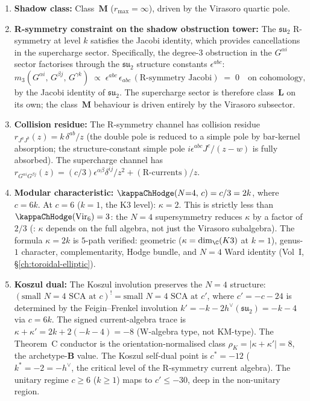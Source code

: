 \begin{proposition}[Small $N{=}4$ SCA shadow data;
 \ClaimStatusProvedHere]
\label{prop:N4-shadow}
\begin{enumerate}[label=\textup{(\roman*)},nosep]
\item \textbf{Shadow class:} Class~$\mathbf{M}$
 \textup{(}$r_{\max} = \infty$\textup{)}, driven by the Virasoro
 quartic pole.

\item \textbf{R-symmetry constraint on the shadow obstruction tower:}
 The $\mathfrak{su}_2$ R-symmetry at level $k$ satisfies
 the Jacobi identity, which provides cancellations in the
 supercharge sector. Specifically, the degree-$3$ obstruction
 in the $G^{\alpha i}$ sector factorises through the $\mathfrak{su}_2$
 structure constants $\epsilon^{abc}$:
 \[
 m_3(G^{\alpha i},\, G^{\beta j},\, G^{\gamma k})
 \;\propto\;
 \epsilon^{abc}\, \epsilon_{abc}\,
 (\text{R-symmetry Jacobi})
 \;=\; 0
 \quad\text{on cohomology,}
 \]
 by the Jacobi identity of $\mathfrak{su}_2$.
 The supercharge sector is therefore class~$\mathbf{L}$ on its own;
 the class~$\mathbf{M}$ behaviour is driven entirely by the
 Virasoro subsector.

\item \textbf{Collision residue:}
 The R-symmetry channel has collision residue
 $r_{J^aJ^b}(z) = k\,\delta^{ab}/z$
 \textup{(}the double pole is reduced to a simple pole by
 bar-kernel absorption; the structure-constant simple pole
 $i\epsilon^{abc}J^c/(z-w)$ is fully absorbed\textup{)}.
 The supercharge channel has
 $r_{G^{\alpha i}G^{\beta j}}(z)
 = (c/3)\epsilon^{\alpha\beta}\delta^{ij}/z^2 + (\text{R-currents})/z$.

\item \textbf{Modular characteristic:}
 $\kappaChHodge(N{=}4,\, c) = c/3 = 2k$, where $c = 6k$.
 At $c = 6$ \textup{(}$k = 1$, the K3 level\textup{)}:
 $\kappa = 2$. This is strictly less than
 $\kappaChHodge(\mathrm{Vir}_6) = 3$: the $N{=}4$ supersymmetry
 reduces $\kappa$ by a factor of $2/3$
 \textup{(}: $\kappa$ depends on the full algebra,
 not just the Virasoro subalgebra\textup{)}.
 The formula $\kappa = 2k$ is $5$-path verified:
 geometric \textup{(}$\kappa = \dim_{\C}(K3)$ at $k = 1$\textup{)},
 genus-$1$ character, complementarity, Hodge bundle, and
 $N{=}4$ Ward identity
 \textup{(}Vol~I, \S\ref{ch:toroidal-elliptic}\textup{)}.

\item \textbf{Koszul dual:}
 The Koszul involution preserves the $N{=}4$ structure:
 $(\text{small $N{=}4$ SCA at $c$})^!
 = \text{small $N{=}4$ SCA at $c'$}$,
 where $c' = -c - 24$ is determined by the
 Feigin--Frenkel involution
 $k' = -k - 2h^\vee(\mathfrak{su}_2) = -k - 4$ via
 $c = 6k$. The signed current-algebra trace is
 $\kappa + \kappa' = 2k + 2(-k-4) = -8$
 \textup{(}W-algebra type, not KM-type\textup{)}.
The Theorem~C conductor is the orientation-normalised class
\(\rho_K=|\kappa+\kappa'|=8\), the archetype-\(\mathbf B\) value.
 The Koszul self-dual point is $c^* = -12$
 \textup{(}$k^* = -2 = -h^\vee$, the critical level of
 the R-symmetry current algebra\textup{)}. The unitary
 regime $c \ge 6$ \textup{(}$k \ge 1$\textup{)} maps to
 $c' \le -30$, deep in the non-unitary region.


\end{enumerate}
\end{proposition}
